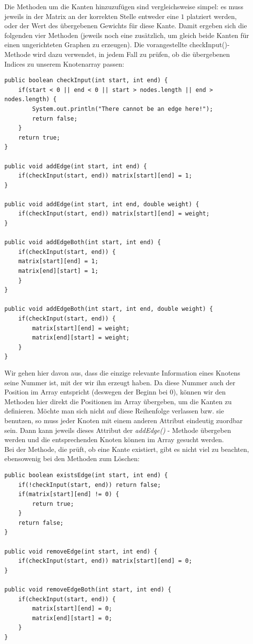\documentclass{article}
\begin{document}
Die Methoden um die Kanten hinzuzufügen sind vergleichsweise simpel: es muss jeweils in der Matrix an der korrekten Stelle entweder eine $1$ platziert werden, oder der Wert des übergebenen Gewichts für diese Kante. Damit ergeben sich die folgenden vier Methoden (jeweils noch eine zusätzlich, um gleich beide Kanten für einen ungerichteten Graphen zu erzeugen). Die vorangestellte checkInput()-Methode wird dazu verwendet, in jedem Fall zu prüfen, ob die übergebenen Indices zu unserem Knotenarray passen:
\begin{verbatim}
public boolean checkInput(int start, int end) {
    if(start < 0 || end < 0 || start > nodes.length || end > nodes.length) {
        System.out.println("There cannot be an edge here!");
        return false;
    }
    return true;
}

public void addEdge(int start, int end) {
    if(checkInput(start, end)) matrix[start][end] = 1;
}

public void addEdge(int start, int end, double weight) {
    if(checkInput(start, end)) matrix[start][end] = weight;
}

public void addEdgeBoth(int start, int end) {
    if(checkInput(start, end)) {
    matrix[start][end] = 1;
    matrix[end][start] = 1;
    }
}

public void addEdgeBoth(int start, int end, double weight) {
    if(checkInput(start, end)) {
        matrix[start][end] = weight;
        matrix[end][start] = weight;
    }
}
\end{verbatim}
Wir gehen hier davon aus, dass die einzige relevante Information eines Knotens seine Nummer ist, mit der wir ihn erzeugt haben. Da diese Nummer auch der Position im Array entspricht (deswegen der Beginn bei 0), können wir den Methoden hier direkt die Positionen im Array übergeben, um die Kanten zu definieren. Möchte man sich nicht auf diese Reihenfolge verlassen bzw. sie benutzen, so muss jeder Knoten mit einem anderen Attribut eindeutig zuordbar sein. Dann kann jeweils dieses Attribut der \textit{addEdge()} - Methode übergeben werden und die entsprechenden Knoten können im Array gesucht werden. \\
Bei der Methode, die prüft, ob eine Kante existiert, gibt es nicht viel zu beachten, ebensowenig bei den Methoden zum Löschen:
\begin{verbatim}
public boolean existsEdge(int start, int end) {
    if(!checkInput(start, end)) return false;
    if(matrix[start][end] != 0) {
        return true;
    }
    return false;
}

public void removeEdge(int start, int end) {
    if(checkInput(start, end)) matrix[start][end] = 0;
}

public void removeEdgeBoth(int start, int end) {
    if(checkInput(start, end)) {
        matrix[start][end] = 0;
        matrix[end][start] = 0;
    }
}
\end{verbatim}
\end{document}
